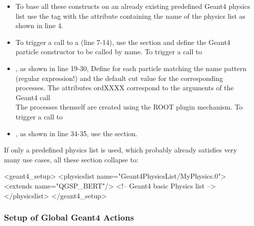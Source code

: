 \documentclass[10pt,a4paper]{article}
\begin{document}
\begin{itemize}\itemcompact
\item To base all these constructs on an already existing predefined Geant4 physics list
    use the  tag with the attribute containing the name of the physics list
    as shown in line 4.
\item To trigger a call to a  (line 7-14), use the  section 
    and define the Geant4 particle constructor to be called by name. To trigger a call to
\item {}, as shown in line 19-30, 
    Define for each particle matching the name pattern (regular expression!) and the 
    default cut value for the corresponding processes. The attributes ordXXXX correspond
    to the arguments of the Geant4 call \\
    The processes themself are created using the ROOT plugin mechanism.
    To trigger a call to
\item {}, as shown in line 34-35, use the  section.
\end{itemize}
If only a predefined physics list is used, which probably already satisfies very many use cases,
all these section collapse to:
\begin{code}
<geant4_setup>
  <physicslist name="Geant4PhysicsList/MyPhysics.0">
    <extends name="QGSP_BERT"/>                    <!-- Geant4 basic Physics list -->
  </physicslist>
</geant4_setup>
\end{code}

\subsubsection{Setup of Global Geant4 Actions}
\label{sec:ddg4-setup-xml-geant4-actions}
\end{document}
